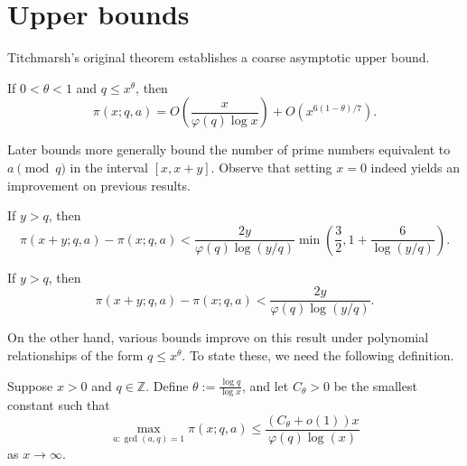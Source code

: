 \section{Upper bounds}
Titchmarsh's original theorem establishes a coarse asymptotic upper bound.

\begin{theorem}
If $0<\theta<1$ and $q\leq x^\theta$, then
$$\pi(x;q,a)=O\left(\frac x{\varphi(q)\log x}\right)+O(x^{6(1-\theta)/7}).$$
\end{theorem}

Later bounds more generally bound the number of prime numbers equivalent to $a\pmod q$ in the interval $[x,x+y]$. Observe that setting $x=0$ indeed yields an improvement on previous results.

\begin{theorem}
If $y>q$, then
$$\pi(x+y;q,a)-\pi(x;q,a)<\frac{2y}{\varphi(q)\log(y/q)}\min\left(\frac32,1+\frac6{\log(y/q)}\right).$$
\end{theorem}

\begin{theorem}
If $y>q$, then
$$\pi(x+y;q,a)-\pi(x;q,a)<\frac{2y}{\varphi(q)\log(y/q)}.$$
\end{theorem}

On the other hand, various bounds improve on this result under polynomial relationships of the form $q\leq x^\theta$. To state these, we need the following definition.
\begin{definition}
Suppose $x>0$ and $q\in\mathbb Z$. Define $\theta:=\frac{\log q}{\log x}$, and let $C_\theta>0$ be the smallest constant such that
$$\max_{a:\gcd(a,q)=1}\pi(x;q,a)\leq\frac{(C_\theta+o(1))x}{\varphi(q)\log(x)}$$
as $x\to\infty$.
\end{definition}

